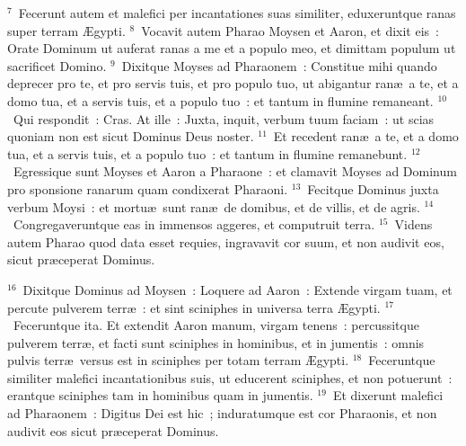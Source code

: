 ${}^{7}$~Fecerunt autem et malefici per incantationes suas similiter, eduxeruntque ranas super terram \AE gypti.
${}^{8}$~Vocavit autem Pharao Moysen et Aaron, et dixit eis~: Orate Dominum ut auferat ranas a me et a populo meo, et dimittam populum ut sacrificet Domino.
${}^{9}$~Dixitque Moyses ad Pharaonem~: Constitue mihi quando deprecer pro te, et pro servis tuis, et pro populo tuo, ut abigantur ran\ae\ a te, et a domo tua, et a servis tuis, et a populo tuo~: et tantum in flumine remaneant.
${}^{10}$~Qui respondit~: Cras. At ille~: Juxta, inquit, verbum tuum faciam~: ut scias quoniam non est sicut Dominus Deus noster.
${}^{11}$~Et recedent ran\ae\ a te, et a domo tua, et a servis tuis, et a populo tuo~: et tantum in flumine remanebunt.
${}^{12}$~Egressique sunt Moyses et Aaron a Pharaone~: et clamavit Moyses ad Dominum pro sponsione ranarum quam condixerat Pharaoni.
${}^{13}$~Fecitque Dominus juxta verbum Moysi~: et mortu\ae\ sunt ran\ae\ de domibus, et de villis, et de agris.
${}^{14}$~Congregaveruntque eas in immensos aggeres, et computruit terra.
${}^{15}$~Videns autem Pharao quod data esset requies, ingravavit cor suum, et non audivit eos, sicut pr\ae ceperat Dominus.


${}^{16}$~Dixitque Dominus ad Moysen~: Loquere ad Aaron~: Extende virgam tuam, et percute pulverem terr\ae~: et sint sciniphes in universa terra \AE gypti.
${}^{17}$~Feceruntque ita. Et extendit Aaron manum, virgam tenens~: percussitque pulverem terr\ae , et facti sunt sciniphes in hominibus, et in jumentis~: omnis pulvis terr\ae\ versus est in sciniphes per totam terram \AE gypti.
${}^{18}$~Feceruntque similiter malefici incantationibus suis, ut educerent sciniphes, et non potuerunt~: erantque sciniphes tam in hominibus quam in jumentis.
${}^{19}$~Et dixerunt malefici ad Pharaonem~: Digitus Dei est hic~; induratumque est cor Pharaonis, et non audivit eos sicut pr\ae ceperat Dominus.


